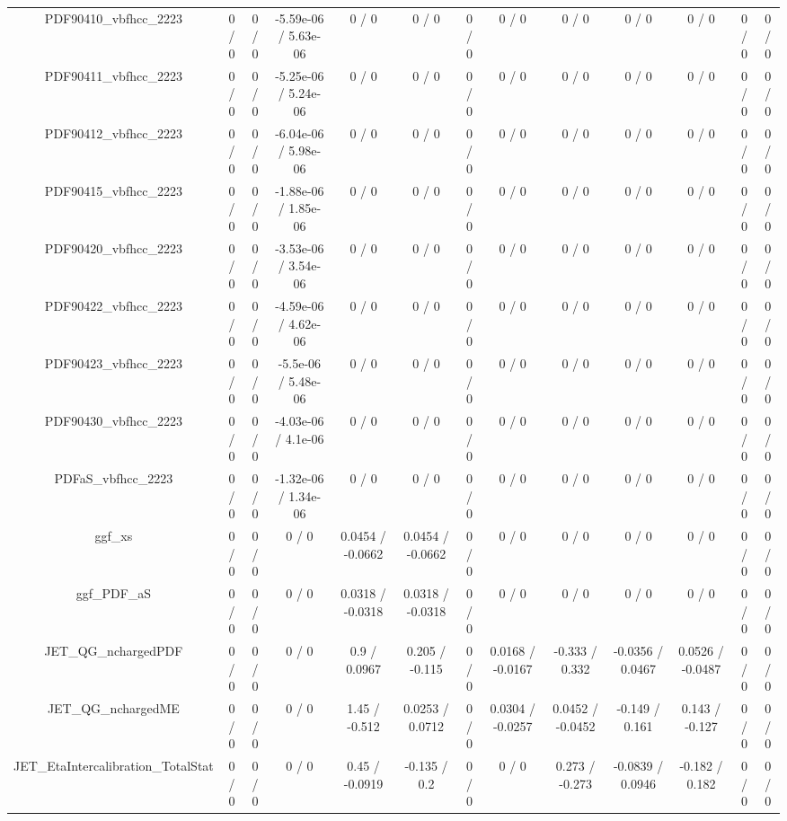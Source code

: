 \documentclass[10pt]{article}
\begin{document}
\begin{table}[htbp]
\begin{center}
\begin{tabular}{|c|c|c|c|c|c|c|c|c|c|c|c|c|}
  PDF90410_vbfhcc_2223 & 0 / 0 & 0 / 0 & -5.59e-06 / 5.63e-06 & 0 / 0 & 0 / 0 & 0 / 0 & 0 / 0 & 0 / 0 & 0 / 0 & 0 / 0 & 0 / 0 & 0 / 0 \\ 
  PDF90411_vbfhcc_2223 & 0 / 0 & 0 / 0 & -5.25e-06 / 5.24e-06 & 0 / 0 & 0 / 0 & 0 / 0 & 0 / 0 & 0 / 0 & 0 / 0 & 0 / 0 & 0 / 0 & 0 / 0 \\ 
  PDF90412_vbfhcc_2223 & 0 / 0 & 0 / 0 & -6.04e-06 / 5.98e-06 & 0 / 0 & 0 / 0 & 0 / 0 & 0 / 0 & 0 / 0 & 0 / 0 & 0 / 0 & 0 / 0 & 0 / 0 \\ 
  PDF90415_vbfhcc_2223 & 0 / 0 & 0 / 0 & -1.88e-06 / 1.85e-06 & 0 / 0 & 0 / 0 & 0 / 0 & 0 / 0 & 0 / 0 & 0 / 0 & 0 / 0 & 0 / 0 & 0 / 0 \\ 
  PDF90420_vbfhcc_2223 & 0 / 0 & 0 / 0 & -3.53e-06 / 3.54e-06 & 0 / 0 & 0 / 0 & 0 / 0 & 0 / 0 & 0 / 0 & 0 / 0 & 0 / 0 & 0 / 0 & 0 / 0 \\ 
  PDF90422_vbfhcc_2223 & 0 / 0 & 0 / 0 & -4.59e-06 / 4.62e-06 & 0 / 0 & 0 / 0 & 0 / 0 & 0 / 0 & 0 / 0 & 0 / 0 & 0 / 0 & 0 / 0 & 0 / 0 \\ 
  PDF90423_vbfhcc_2223 & 0 / 0 & 0 / 0 & -5.5e-06 / 5.48e-06 & 0 / 0 & 0 / 0 & 0 / 0 & 0 / 0 & 0 / 0 & 0 / 0 & 0 / 0 & 0 / 0 & 0 / 0 \\ 
  PDF90430_vbfhcc_2223 & 0 / 0 & 0 / 0 & -4.03e-06 / 4.1e-06 & 0 / 0 & 0 / 0 & 0 / 0 & 0 / 0 & 0 / 0 & 0 / 0 & 0 / 0 & 0 / 0 & 0 / 0 \\ 
  PDFaS_vbfhcc_2223 & 0 / 0 & 0 / 0 & -1.32e-06 / 1.34e-06 & 0 / 0 & 0 / 0 & 0 / 0 & 0 / 0 & 0 / 0 & 0 / 0 & 0 / 0 & 0 / 0 & 0 / 0 \\ 
  ggf_xs & 0 / 0 & 0 / 0 & 0 / 0 & 0.0454 / -0.0662 & 0.0454 / -0.0662 & 0 / 0 & 0 / 0 & 0 / 0 & 0 / 0 & 0 / 0 & 0 / 0 & 0 / 0 \\ 
  ggf_PDF_aS & 0 / 0 & 0 / 0 & 0 / 0 & 0.0318 / -0.0318 & 0.0318 / -0.0318 & 0 / 0 & 0 / 0 & 0 / 0 & 0 / 0 & 0 / 0 & 0 / 0 & 0 / 0 \\ 
  JET_QG_nchargedPDF & 0 / 0 & 0 / 0 & 0 / 0 & 0.9 / 0.0967 & 0.205 / -0.115 & 0 / 0 & 0.0168 / -0.0167 & -0.333 / 0.332 & -0.0356 / 0.0467 & 0.0526 / -0.0487 & 0 / 0 & 0 / 0 \\ 
  JET_QG_nchargedME & 0 / 0 & 0 / 0 & 0 / 0 & 1.45 / -0.512 & 0.0253 / 0.0712 & 0 / 0 & 0.0304 / -0.0257 & 0.0452 / -0.0452 & -0.149 / 0.161 & 0.143 / -0.127 & 0 / 0 & 0 / 0 \\ 
  JET_EtaIntercalibration_TotalStat & 0 / 0 & 0 / 0 & 0 / 0 & 0.45 / -0.0919 & -0.135 / 0.2 & 0 / 0 & 0 / 0 & 0.273 / -0.273 & -0.0839 / 0.0946 & -0.182 / 0.182 & 0 / 0 & 0 / 0 \\ 

\end{tabular}
\end{center}
\end{table}
\end{document}
